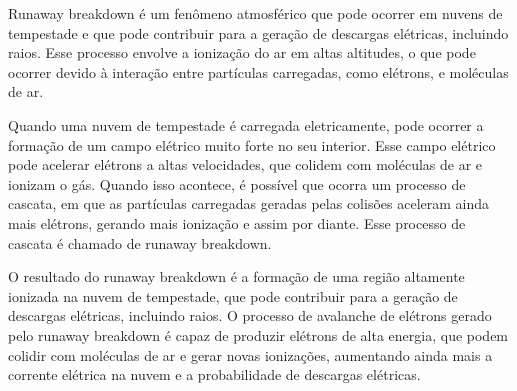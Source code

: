 \documentclass[a4paper, 12pt, onecolumn,singlespacing]{article}
\begin{document}
\begin{itemize}
\begin{itemize}
			Runaway breakdown é um fenômeno atmosférico que pode ocorrer em nuvens de tempestade e que pode contribuir para a geração de descargas elétricas, incluindo raios. Esse processo envolve a ionização do ar em altas altitudes, o que pode ocorrer devido à interação entre partículas carregadas, como elétrons, e moléculas de ar.
			
			Quando uma nuvem de tempestade é carregada eletricamente, pode ocorrer a formação de um campo elétrico muito forte no seu interior. Esse campo elétrico pode acelerar elétrons a altas velocidades, que colidem com moléculas de ar e ionizam o gás. Quando isso acontece, é possível que ocorra um processo de cascata, em que as partículas carregadas geradas pelas colisões aceleram ainda mais elétrons, gerando mais ionização e assim por diante. Esse processo de cascata é chamado de runaway breakdown.
			
			O resultado do runaway breakdown é a formação de uma região altamente ionizada na nuvem de tempestade, que pode contribuir para a geração de descargas elétricas, incluindo raios. O processo de avalanche de elétrons gerado pelo runaway breakdown é capaz de produzir elétrons de alta energia, que podem colidir com moléculas de ar e gerar novas ionizações, aumentando ainda mais a corrente elétrica na nuvem e a probabilidade de descargas elétricas.
		\end{itemize}
	\end{itemize}
	
\end{document}
